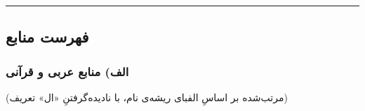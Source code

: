 \documentclass[12pt,a4paper]{article}
\begin{document}
\begin{RTL}
\begin{otherlanguage}{persian}
\begin{center}\rule{0.5\linewidth}{0.5pt}\end{center}

\subsection{فهرست
منابع}\label{ux641ux647ux631ux633ux62a-ux645ux646ux627ux628ux639}

\subsubsection{الف) منابع عربی و
قرآنی}\label{ux627ux644ux641-ux645ux646ux627ux628ux639-ux639ux631ux628ux6cc-ux648-ux642ux631ux622ux646ux6cc}

(مرتب‌شده بر اساسِ الفبای ریشه‌ی نام، با نادیده‌گرفتنِ «ال» تعریف)


\end{otherlanguage}
\end{RTL}
\end{document}

